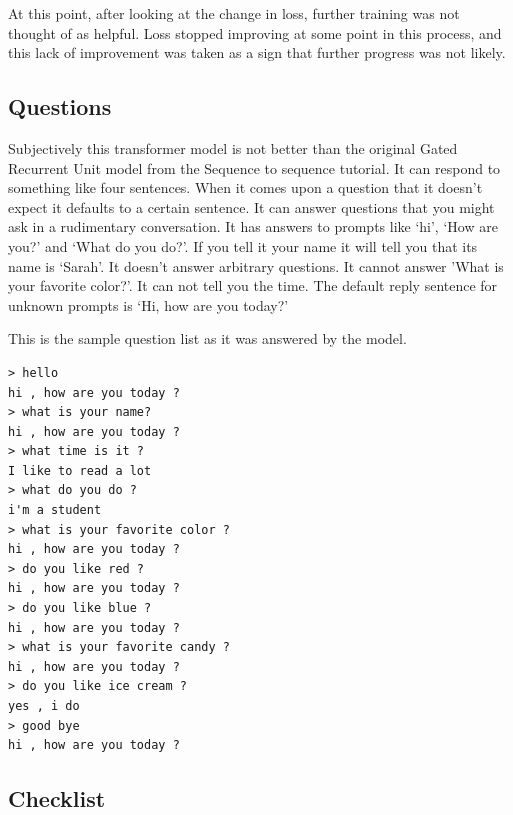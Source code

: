 At this point, after looking at the change in loss, further training was not thought of as helpful. Loss stopped improving at some point in this process, and this lack of improvement was taken as a sign that further progress was not likely.

\subsection{Questions}
Subjectively this transformer model is not better than the original Gated Recurrent Unit model from the Sequence to sequence tutorial. It can respond to something like four sentences. When it comes upon a question that it doesn't expect it defaults to a certain sentence. It can answer questions that you might ask in a rudimentary conversation. It has answers to prompts like `hi', `How are you?' and `What do you do?'. If you tell it your name it will tell you that its name is `Sarah'. It doesn't answer arbitrary questions. It cannot answer 'What is your favorite color?'. It can not tell you the time. The default reply sentence for unknown prompts is `Hi, how are you today?'

This is the sample question list as it was answered by the model.

\begin{verbatim}
> hello
hi , how are you today ?
> what is your name?
hi , how are you today ?
> what time is it ?
I like to read a lot
> what do you do ?
i'm a student
> what is your favorite color ?
hi , how are you today ?
> do you like red ?
hi , how are you today ?
> do you like blue ?
hi , how are you today ?
> what is your favorite candy ?
hi , how are you today ?
> do you like ice cream ?
yes , i do 
> good bye
hi , how are you today ?
\end{verbatim}

\subsection{Checklist}

